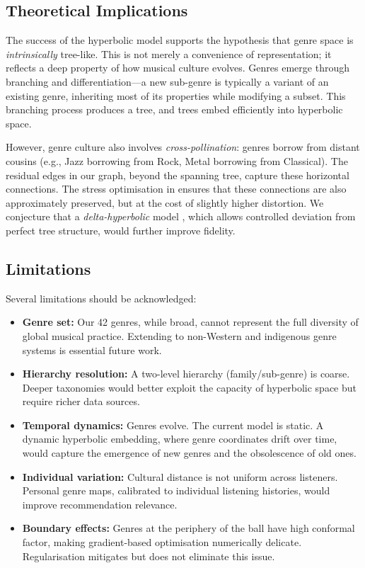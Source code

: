 \documentclass[12pt,a4paper]{article}
\begin{document}
\subsection{Theoretical Implications}

The success of the hyperbolic model supports the hypothesis that genre space is \emph{intrinsically} tree-like. This is not merely a convenience of representation; it reflects a deep property of how musical culture evolves. Genres emerge through branching and differentiation---a new sub-genre is typically a variant of an existing genre, inheriting most of its properties while modifying a subset. This branching process produces a tree, and trees embed efficiently into hyperbolic space.

However, genre culture also involves \emph{cross-pollination}: genres borrow from distant cousins (e.g., Jazz borrowing from Rock, Metal borrowing from Classical). The residual edges in our graph, beyond the spanning tree, capture these horizontal connections. The stress optimisation in  ensures that these connections are also approximately preserved, but at the cost of slightly higher distortion. We conjecture that a \emph{delta-hyperbolic} model \citep{gromov1987hyperbolic}, which allows controlled deviation from perfect tree structure, would further improve fidelity.

\subsection{Limitations}

Several limitations should be acknowledged:
\begin{itemize}
  \item \textbf{Genre set:} Our 42 genres, while broad, cannot represent the full diversity of global musical practice. Extending to non-Western and indigenous genre systems is essential future work.
  \item \textbf{Hierarchy resolution:} A two-level hierarchy (family/sub-genre) is coarse. Deeper taxonomies would better exploit the capacity of hyperbolic space but require richer data sources.
  \item \textbf{Temporal dynamics:} Genres evolve. The current model is static. A dynamic hyperbolic embedding, where genre coordinates drift over time, would capture the emergence of new genres and the obsolescence of old ones.
  \item \textbf{Individual variation:} Cultural distance is not uniform across listeners. Personal genre maps, calibrated to individual listening histories, would improve recommendation relevance.
  \item \textbf{Boundary effects:} Genres at the periphery of the ball have high conformal factor, making gradient-based optimisation numerically delicate. Regularisation mitigates but does not eliminate this issue.
\end{itemize}
\end{document}
